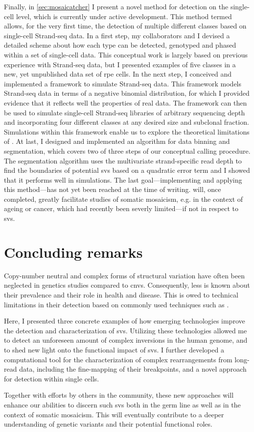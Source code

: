 Finally, in \cref{sec:mosaicatcher} I present a novel method for \sv detection on
the single-cell level, which is currently under active development. This method
termed \mc allows, for the very first time, the detection of
multiple different \sv classes based on single-cell Strand-seq data. In a first
step, my collaborators and I devised a detailed scheme about how each \sv type
can be detected, genotyped and phased within a set of single-cell data. This
conceptual work is largely based on previous experience with Strand-seq data,
but I presented examples of five \sv classes in a new, yet
unpublished data set of \acl{rpe} cells. In the next step, I conceived and
implemented a framework to simulate Strand-seq data. This framework models
Strand-seq data in terms of a negative binomial distribution, for which I
provided evidence that it reflects well the properties of real data. The
framework can then be used to simulate single-cell Strand-seq libraries of
arbitrary sequencing depth and incorporating four
different \sv classes at any desired size and subclonal fraction. Simulations
within this framework enable us to explore the theoretical limitations of
\mc. At last, I designed and implemented an algorithm for data binning
and segmentation, which covers two of three steps of our conceptual \sv calling
procedure. The segmentation algorithm uses the multivariate strand-specific read
depth to find the boundaries of potential \acp{sv} based on a quadratic error
term and I showed that it performs well in
simulations. The last goal---implementing and applying this method---has not yet
been reached at the time of writing. \mc will, once completed, greatly
facilitate studies of somatic mosaicism, e.g. in the context of ageing or cancer,
which had recently been severly limited---if not in respect to \acp{sv}.




\section{Concluding remarks}
Copy-number neutral and complex forms of structural variation have often been
neglected in genetics studies compared to \acp{cnv}. Consequently, less is known
about their prevalence and their role in health and disease. This is owed to
technical limitations in their detection based on commonly used techniques
such as \mps.

Here, I presented three concrete examples of how emerging technologies improve
the detection and characterization of \acp{sv}. Utilizing these technologies
allowed me to detect an unforeseen amount of complex inversions in the human
genome, and to shed new light onto the functional impact of \acp{sv}.
I further developed a computational tool for the characterization of complex
rearrangements from long-read data, including the fine-mapping of their
breakpoints, and a novel approach for \sv detection within single cells.

Together with efforts by others in the community, these new approaches will
enhance our abilities to discern such \acp{sv} both in the germ line as well as
in the context of somatic mosaicism. This will eventually contribute to a deeper
understanding of genetic variants and their potential functional roles.


